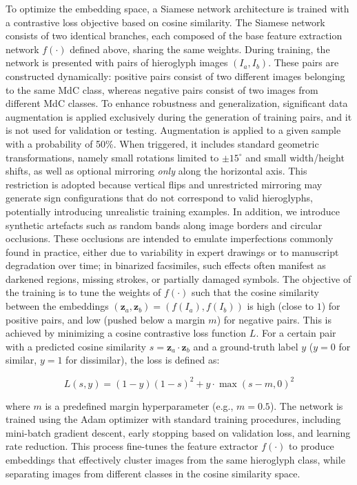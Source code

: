 \documentclass[10pt,onecolumn,letterpaper]{article}
\begin{document}
To optimize the embedding space, a Siamese network architecture is trained with a contrastive loss objective based on cosine similarity. The Siamese network consists of two identical branches, each composed of the base feature extraction network $f(\cdot)$ defined above, sharing the same weights. During training, the network is presented with pairs of hieroglyph images $(I_a, I_b)$. These pairs are constructed dynamically: positive pairs consist of two different images belonging to the same MdC class, whereas negative pairs consist of two images from different MdC classes. To enhance robustness and generalization, significant data augmentation is applied exclusively during the generation of training pairs, and it is not used for validation or testing. Augmentation is applied to a given sample with a probability of 50\%. When triggered, it includes standard geometric transformations, namely small rotations limited to $\pm 15^{\circ}$ and small width/height shifts, as well as optional mirroring \emph{only} along the horizontal axis. This restriction is adopted because vertical flips and unrestricted mirroring may generate sign configurations that do not correspond to valid hieroglyphs, potentially introducing unrealistic training examples. In addition, we introduce synthetic artefacts such as random bands along image borders and circular occlusions. These occlusions are intended to emulate imperfections commonly found in practice, either due to variability in expert drawings or to manuscript degradation over time; in binarized facsimiles, such effects often manifest as darkened regions, missing strokes, or partially damaged symbols.
The objective of the training is to tune the weights of $f(\cdot)$ such that the cosine similarity between the embeddings $(\mathbf{z}_a, \mathbf{z}_b) = (f(I_a), f(I_b))$ is high (close to $1$) for positive pairs, and low (pushed below a margin $m$) for negative pairs. This is achieved by minimizing a cosine contrastive loss function $L$. For a certain pair with a predicted cosine similarity $s = \mathbf{z}_a \cdot \mathbf{z}_b$ and a ground-truth label $y$ ($y=0$ for similar, $y=1$ for dissimilar), the loss is defined as:

\begin{equation} \label{eq:contrastive_loss}
	L(s, y) = (1-y)(1-s)^2 + y \cdot \max(s - m, 0)^2
\end{equation}

where $m$ is a predefined margin hyperparameter (e.g., $m=0.5$). The network is trained using the Adam optimizer \cite{kingma2014} with standard training procedures, including mini-batch gradient descent, early stopping based on validation loss, and learning rate reduction. This process fine-tunes the feature extractor $f(\cdot)$ to produce embeddings that effectively cluster images from the same hieroglyph class, while separating images from different classes in the cosine similarity space.
\end{document}
